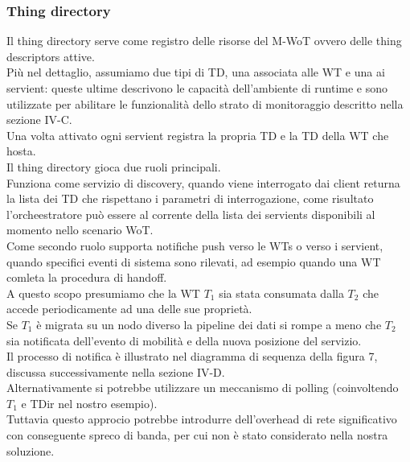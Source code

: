 \documentclass[11pt]{article}
\begin{document}
		\subsubsection{Thing directory}
		Il thing directory serve come registro delle risorse del M-WoT ovvero delle thing descriptors attive. \\ Più nel dettaglio, assumiamo due tipi di TD, una associata alle WT e una ai servient: queste ultime descrivono le capacità dell'ambiente di runtime e sono utilizzate per abilitare le funzionalità dello strato di monitoraggio descritto nella sezione IV-C.\\ 
		Una volta attivato ogni servient registra la propria TD e la TD della WT che hosta.\\
		Il thing directory gioca due ruoli principali. \\
		Funziona come servizio di discovery, quando viene interrogato dai client returna la lista dei TD che rispettano i parametri di interrogazione, come risultato l'orcheestratore può essere al corrente della lista dei servients disponibili al momento nello scenario WoT.\\
		Come secondo ruolo supporta notifiche push verso le WTs o verso i servient, quando specifici eventi di sistema sono rilevati, ad esempio quando una WT comleta la procedura di handoff. \\
		A questo scopo presumiamo che la WT $T_1$ sia stata consumata dalla $T_2$ che accede periodicamente ad una delle sue proprietà. \\
		Se $T_1$ è migrata su un nodo diverso la pipeline dei dati si rompe a meno che $T_2$ sia notificata dell'evento di mobilità e della nuova posizione del servizio. \\
		Il processo di notifica è illustrato nel diagramma di sequenza della figura 7, discussa successivamente nella sezione IV-D. \\
		Alternativamente si potrebbe utilizzare un meccanismo di polling (coinvoltendo $T_1$ e TDir nel nostro esempio).\\
		Tuttavia questo approcio potrebbe introdurre dell'overhead di rete significativo con conseguente spreco di banda, per cui non è stato considerato nella nostra soluzione.
\end{document}
